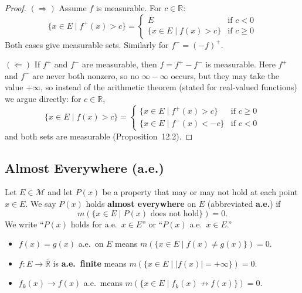 \documentclass[11pt]{report}
\begin{document}
\begin{proof}
$(\Rightarrow)$ Assume $f$ is measurable. For $c \in \mathbb{R}$:
\[
\{x \in E \mid f^+(x) > c\} = \begin{cases}
E & \text{if } c < 0 \\
\{x \in E \mid f(x) > c\} & \text{if } c \geq 0
\end{cases}
\]
Both cases give measurable sets. Similarly for $f^- = (-f)^+$.

$(\Leftarrow)$ If $f^+$ and $f^-$ are measurable, then $f = f^+ - f^-$ is measurable. Here $f^+$ and $f^-$ are never both nonzero, so no $\infty - \infty$ occurs, but they may take the value $+\infty$, so instead of the arithmetic theorem (stated for real-valued functions) we argue directly: for $c \in \mathbb{R}$,
\[
\{x \in E \mid f(x) > c\} = \begin{cases}
\{x \in E \mid f^+(x) > c\} & \text{if } c \geq 0 \\
\{x \in E \mid f^-(x) < -c\} & \text{if } c < 0
\end{cases}
\]
and both sets are measurable (Proposition~12.2).
\end{proof}

\subsection{Almost Everywhere (a.e.)}

\begin{defbox}
Let $E \in \mathcal{M}$ and let $P(x)$ be a property that may or may not hold at each point $x \in E$. We say $P(x)$ holds \textbf{almost everywhere} on $E$ (abbreviated \textbf{a.e.}) if
\[
m\left(\{x \in E \mid P(x) \text{ does not hold}\}\right) = 0.
\]
We write ``$P(x)$ holds for a.e.\ $x \in E$'' or ``$P(x)$ a.e.\ $x \in E$.''
\end{defbox}

\begin{exbox}
\begin{itemize}
    \item $f(x) = g(x)$ a.e.\ on $E$ means $m(\{x \in E \mid f(x) \neq g(x)\}) = 0$.
    \item $f: E \to \overline{\mathbb{R}}$ is \textbf{a.e.\ finite} means $m(\{x \in E \mid |f(x)| = +\infty\}) = 0$.
    \item $f_k(x) \to f(x)$ a.e.\ means $m(\{x \in E \mid f_k(x) \not\to f(x)\}) = 0$.
\end{itemize}
\end{exbox}
\end{document}
